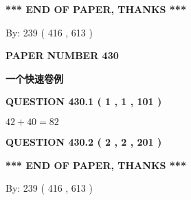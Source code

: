\documentclass{ctexart}
\begin{document}
   
 \vspace{0.2in}
 
   
   
   
   
\vspace{1.0in} 
{\textbf{\large{ *** END OF PAPER, THANKS *** }}} 
   
   
\hspace{1.0in} By: 
 239 ( 416 ,  613 )
   
   
   
   
\newpage 
\setcounter{page}{ 
   430001 } 
   
   
   
   
 {\textbf{ \Large{ PAPER NUMBER  430  }}}
   
   
\vspace{0.2in}
   
   
   
   
   
   
 \vspace{0.2in}
{\LARGE {\textbf{ 一个快速卷例}}}
   
   
  
\vspace{0.2in}
  
{\textbf{\Large{QUESTION
430.1 
 ( 1 , 1 , 101 )
}}}
  
  
 
 

$ %
42 +  %
40=   %
82$
 
 
  
\vspace{0.2in}
  
{\textbf{\Large{QUESTION
430.2 
 ( 2 , 2 , 201 )
}}}
  
  
   
   
 \vspace{0.2in}
 
   
   
   
   
\vspace{1.0in} 
{\textbf{\large{ *** END OF PAPER, THANKS *** }}} 
   
   
\hspace{1.0in} By: 
 239 ( 416 ,  613 )
   
   
   
   
\newpage 
\setcounter{page}{ 
   431001 } 
   
   
   
\end{document}
